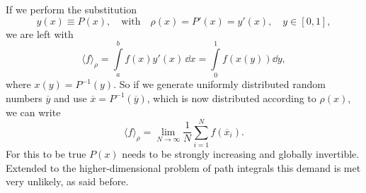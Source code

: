 %
%
If we perform the substitution
%
%
\begin{equation}
y(x) \equiv P(x), \quad \text{with} \quad \rho(x) = P'(x)=y'(x), \quad y \in [0,1],
\end{equation}
%
%
we are left with
%
%
\begin{equation}
\langle f \rangle_{\rho} = \int \limits_{a}^{b}f(x) y'(x) \,\dd x = \int\limits_{0}^{1} f\left(x\left(y\right)\right) \dd y,
\end{equation}
%
%
where $x(y)=P^{-1}(y)$. So if we generate uniformly distributed random numbers $\overline{y}$ and use $\overline{x}=P^{-1}(\overline{y})$, which is now distributed according to $\rho(x)$, we can write
%
%
\begin{equation}
\langle f \rangle_{\rho} = \lim_{N \to \infty} \dfrac{1}{N} \sum\limits_{i=1}^{N} f(\overline{x}_{i}).
\label{eq: vev_rho}
\end{equation}
%
%
For this to be true $P(x)$ needs to be strongly increasing and globally invertible. Extended to the higher-dimensional problem of path integrals this demand is met very unlikely, as said before.

